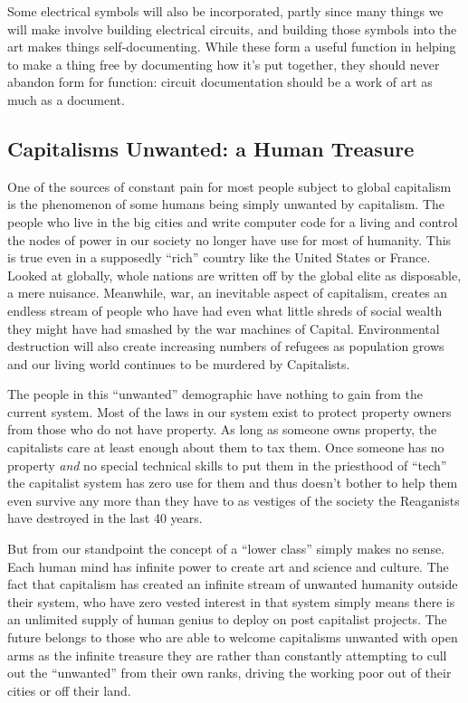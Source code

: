 Some electrical symbols will also be incorporated, partly since many
things we will make involve building electrical circuits, and building
those symbols into the art makes things self-documenting. While these
form a useful function in helping to make a thing free by documenting
how it's put together, they should never abandon form for function:
circuit documentation should be a work of art as much as a document.

\subsection{Capitalisms Unwanted: a Human
Treasure}\label{capitalisms-unwanted-a-human-treasure}

One of the sources of constant pain for most people subject to global
capitalism is the phenomenon of some humans being simply unwanted by
capitalism. The people who live in the big cities and write computer
code for a living and control the nodes of power in our society no
longer have use for most of humanity. This is true even in a supposedly
``rich'' country like the United States or France. Looked at globally,
whole nations are written off by the global elite as disposable, a mere
nuisance. Meanwhile, war, an inevitable aspect of capitalism, creates an
endless stream of people who have had even what little shreds of social
wealth they might have had smashed by the war machines of Capital.
Environmental destruction will also create increasing numbers of
refugees as population grows and our living world continues to be
murdered by Capitalists.

The people in this ``unwanted'' demographic have nothing to gain from
the current system. Most of the laws in our system exist to protect
property owners from those who do not have property. As long as someone
owns property, the capitalists care at least enough about them to tax
them. Once someone has no property \emph{and} no special technical
skills to put them in the priesthood of ``tech'' the capitalist system
has zero use for them and thus doesn't bother to help them even survive
any more than they have to as vestiges of the society the Reaganists
have destroyed in the last 40 years.

But from our standpoint the concept of a ``lower class'' simply makes no
sense. Each human mind has infinite power to create art and science and
culture. The fact that capitalism has created an infinite stream of
unwanted humanity outside their system, who have zero vested interest in
that system simply means there is an unlimited supply of human genius to
deploy on post capitalist projects. The future belongs to those who are
able to welcome capitalisms unwanted with open arms as the infinite
treasure they are rather than constantly attempting to cull out the
``unwanted'' from their own ranks, driving the working poor out of their
cities or off their land.

